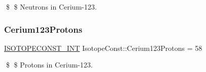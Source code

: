 \$ \$ Neutrons in Cerium-\/123. \mbox{\label{group___isotope_const-_cerium-_ce123_ga6ef26bea47ca01adf29aa44fb92a7817}} 
\subsubsection{\texorpdfstring{Cerium123\+Protons}{Cerium123Protons}}
{\footnotesize\ttfamily \mbox{\hyperlink{group___isotope_const-_macros_ga5f18360b3e99483a35c32d789e62621c}{I\+S\+O\+T\+O\+P\+E\+C\+O\+N\+S\+T\+\_\+\+I\+NT}} Isotope\+Const\+::\+Cerium123\+Protons = 58}

\$ \$ Protons in Cerium-\/123. 